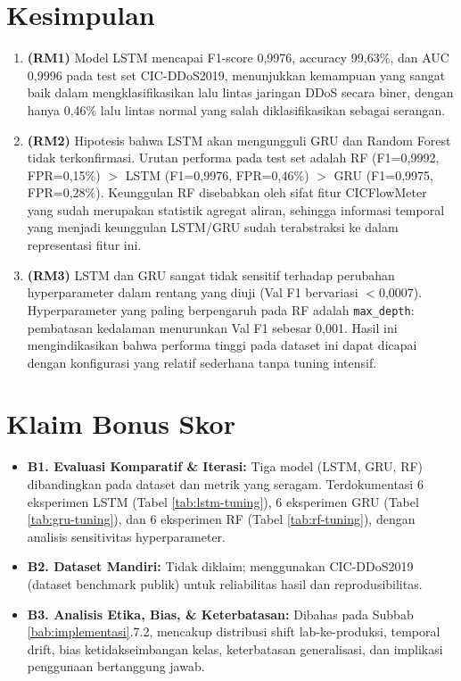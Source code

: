 \documentclass[11pt,a4paper,oneside]{report}
\begin{document}
\section{Kesimpulan}

\begin{enumerate}[leftmargin=*]
    \item \textbf{(RM1)} Model LSTM mencapai F1-score 0,9976, accuracy 99,63\%, dan AUC 0,9996 pada test set CIC-DDoS2019, menunjukkan kemampuan yang sangat baik dalam mengklasifikasikan lalu lintas jaringan DDoS secara biner, dengan hanya 0,46\% lalu lintas normal yang salah diklasifikasikan sebagai serangan.

    \item \textbf{(RM2)} Hipotesis bahwa LSTM akan mengungguli GRU dan Random Forest tidak terkonfirmasi. Urutan performa pada test set adalah RF (F1=0,9992, FPR=0,15\%) $>$ LSTM (F1=0,9976, FPR=0,46\%) $>$ GRU (F1=0,9975, FPR=0,28\%). Keunggulan RF disebabkan oleh sifat fitur CICFlowMeter yang sudah merupakan statistik agregat aliran, sehingga informasi temporal yang menjadi keunggulan LSTM/GRU sudah terabstraksi ke dalam representasi fitur ini.

    \item \textbf{(RM3)} LSTM dan GRU sangat tidak sensitif terhadap perubahan hyperparameter dalam rentang yang diuji (Val F1 bervariasi $<$0,0007). Hyperparameter yang paling berpengaruh pada RF adalah \texttt{max\_depth}: pembatasan kedalaman menurunkan Val F1 sebesar 0,001. Hasil ini mengindikasikan bahwa performa tinggi pada dataset ini dapat dicapai dengan konfigurasi yang relatif sederhana tanpa tuning intensif.
\end{enumerate}

\section{Klaim Bonus Skor}

\begin{itemize}[leftmargin=*]
    \item[$\checkmark$] \textbf{B1. Evaluasi Komparatif \& Iterasi:} Tiga model (LSTM, GRU, RF) dibandingkan pada dataset dan metrik yang seragam. Terdokumentasi 6 eksperimen LSTM (Tabel \ref{tab:lstm-tuning}), 6 eksperimen GRU (Tabel \ref{tab:gru-tuning}), dan 6 eksperimen RF (Tabel \ref{tab:rf-tuning}), dengan analisis sensitivitas hyperparameter.
    \item[$\square$] \textbf{B2. Dataset Mandiri:} Tidak diklaim; menggunakan CIC-DDoS2019 (dataset benchmark publik) untuk reliabilitas hasil dan reprodusibilitas.
    \item[$\checkmark$] \textbf{B3. Analisis Etika, Bias, \& Keterbatasan:} Dibahas pada Subbab \ref{bab:implementasi}.7.2, mencakup distribusi shift lab-ke-produksi, temporal drift, bias ketidakseimbangan kelas, keterbatasan generalisasi, dan implikasi penggunaan bertanggung jawab.
\end{itemize}
\end{document}
